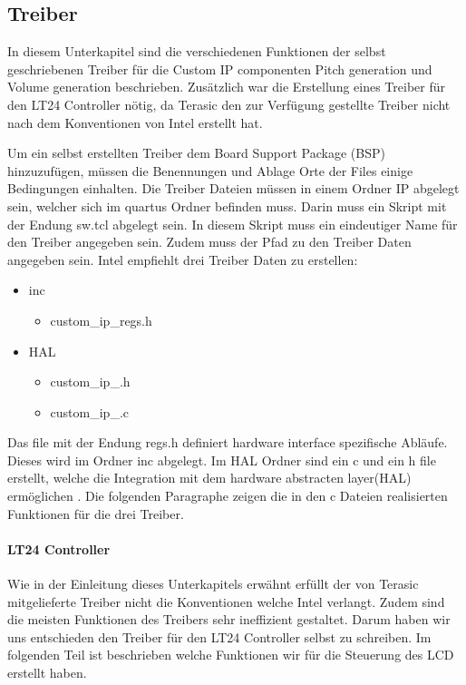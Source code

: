 \subsection{Treiber}\label{subsec:drivers}
In diesem Unterkapitel sind die verschiedenen Funktionen der selbst geschriebenen Treiber für die Custom IP componenten Pitch generation und Volume generation beschrieben. Zusätzlich war die Erstellung  eines Treiber für den LT24 Controller nötig, da Terasic den zur Verfügung gestellte Treiber nicht nach dem Konventionen von Intel erstellt hat.

Um ein selbst erstellten Treiber dem Board Support Package (BSP) hinzuzufügen, müssen  die Benennungen und Ablage Orte der Files einige Bedingungen einhalten.  
 Die Treiber Dateien müssen in einem Ordner IP abgelegt sein, welcher sich im quartus Ordner befinden muss. Darin muss ein Skript mit der Endung sw.tcl abgelegt sein. In diesem Skript muss ein eindeutiger Name für den Treiber angegeben sein. Zudem muss der Pfad zu den Treiber Daten angegeben sein. Intel empfiehlt drei Treiber Daten zu erstellen:
  \renewcommand{\labelitemi}{$\blacksquare$}
 \renewcommand\labelitemii{$\square$}
 \begin{itemize}
 	\item  inc
 	\begin{itemize}
 		\item  custom\_ip\_regs.h
 	\end{itemize}
 \end{itemize}
 \begin{itemize}
	\item  HAL
	\begin{itemize}
		\item  custom\_ip\_.h
		\item  custom\_ip\_.c
	\end{itemize}
\end{itemize}

  Das file mit der Endung regs.h definiert hardware interface spezifische Abläufe. Dieses wird im Ordner inc abgelegt. Im HAL Ordner sind ein c und ein h file erstellt, welche die Integration mit dem hardware abstracten layer(HAL) ermöglichen \cite{NIOS_II_soft}.
 Die folgenden Paragraphe zeigen die in den c Dateien realisierten Funktionen für die drei Treiber.
\paragraph{LT24 Controller}

Wie in der Einleitung dieses Unterkapitels erwähnt erfüllt der von Terasic mitgelieferte Treiber nicht die Konventionen welche Intel verlangt. Zudem sind die meisten Funktionen des Treibers sehr ineffizient gestaltet. Darum haben wir uns entschieden den Treiber für den LT24 Controller selbst zu schreiben. Im folgenden Teil ist beschrieben welche Funktionen wir für die Steuerung des LCD erstellt haben.

